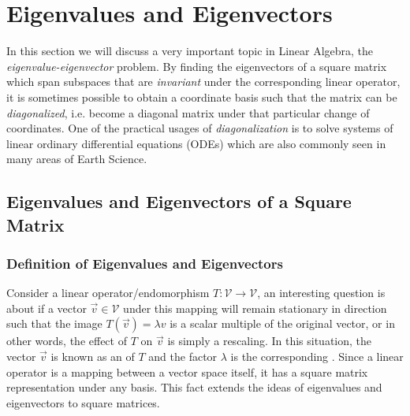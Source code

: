 \chapter{Eigenvalues and Eigenvectors}
\label{chap:eigen}

In this section we will discuss a very important topic in Linear Algebra, the \textit{eigenvalue-eigenvector} problem. By finding the eigenvectors of a square matrix which span subspaces that are \textit{invariant} under the corresponding linear operator, it is sometimes possible to obtain a coordinate basis such that the matrix can be \textit{diagonalized}, i.e. become a diagonal matrix under that particular change of coordinates. One of the practical usages of \textit{diagonalization} is to solve systems of linear ordinary differential equations (ODEs) which are also commonly seen in many areas of Earth Science.

\section{Eigenvalues and Eigenvectors of a Square Matrix}
\label{section:eigensection}

\subsection{Definition of Eigenvalues and Eigenvectors}

Consider a linear operator/endomorphism $T: \mathcal{V} \to \mathcal{V}$, an interesting question is about if a vector $\vec{v} \in \mathcal{V}$ under this mapping will remain stationary in direction such that the image $T(\vec{v}) = \lambda v$ is a scalar multiple of the original vector, or in other words, the effect of $T$ on $\vec{v}$ is simply a rescaling. In this situation, the vector $\vec{v}$ is known as an  of $T$ and the factor $\lambda$ is the corresponding . Since a linear operator is a mapping between a vector space itself, it has a square matrix representation under any basis. This fact extends the ideas of eigenvalues and eigenvectors to square matrices.

